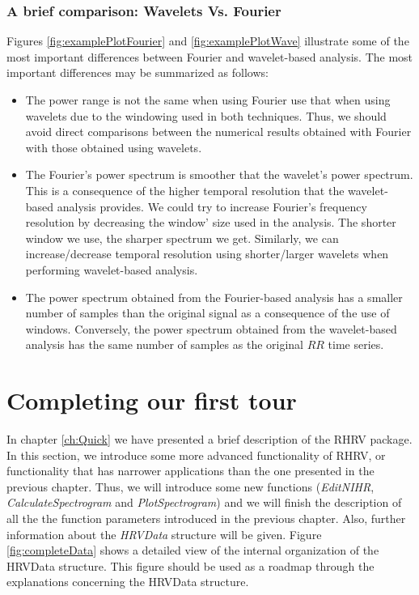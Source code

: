 \documentclass[12pt,lot, lof]{puthesis}
\begin{document}
\subsubsection{A brief comparison: Wavelets Vs. Fourier} Figures 
\ref{fig:examplePlotFourier} and \ref{fig:examplePlotWave} illustrate some of 
the most important differences between Fourier and wavelet-based analysis. The 
most important differences may be summarized as follows:
\begin{itemize}
\item The power range is not the same when using Fourier use that when using 
wavelets due
to the windowing used in both techniques. Thus, we
should avoid direct comparisons between the numerical results obtained with 
Fourier with those obtained using wavelets.
\item The Fourier's power spectrum is smoother that the wavelet's power 
spectrum. This is a consequence of the higher temporal resolution that the 
wavelet-based analysis provides. We could try to increase Fourier's
frequency resolution by decreasing the window' size used in the analysis. The 
shorter window we use, the sharper spectrum we get. Similarly, we can 
increase/decrease temporal resolution using shorter/larger wavelets when 
performing 
wavelet-based analysis.  
\item The power spectrum obtained from the Fourier-based analysis has a smaller 
number of samples than the original signal as a consequence of the use of 
windows. Conversely, the power spectrum obtained from the wavelet-based 
analysis has the same number of samples as the original $RR$ time series.
\end{itemize}


\section{Completing our first tour}
In chapter \ref{ch:Quick} we have presented a brief description of the RHRV 
package. In this
section, we introduce some more advanced functionality of RHRV, or 
functionality that has narrower applications  than the one presented in the 
previous chapter. Thus, we will introduce some new functions 
(\textit{EditNIHR}, \textit{CalculateSpectrogram} and \textit{PlotSpectrogram}) 
and we will finish
the description of all the the function parameters introduced in the previous 
chapter. Also, further information about the 
\textit{HRVData} structure will be given.  Figure \ref{fig:completeData} shows
a detailed view of the internal organization of the HRVData structure. This 
figure
should be used as a roadmap through the explanations concerning the HRVData 
structure.
\end{document}
